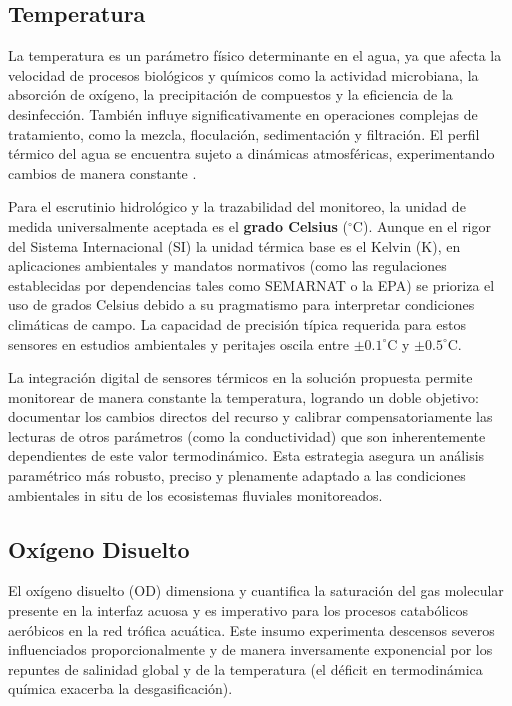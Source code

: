 \subsection{Temperatura}
La temperatura es un parámetro físico determinante en el agua, ya que afecta la velocidad de procesos biológicos y químicos como la actividad microbiana, la absorción de oxígeno, la precipitación de compuestos y la eficiencia de la desinfección. También influye significativamente en operaciones complejas de tratamiento, como la mezcla, floculación, sedimentación y filtración. El perfil térmico del agua se encuentra sujeto a dinámicas atmosféricas, experimentando cambios de manera constante \cite{uno2020}.

Para el escrutinio hidrológico y la trazabilidad del monitoreo, la unidad de medida universalmente aceptada es el \textbf{grado Celsius} ($^\circ$C). Aunque en el rigor del Sistema Internacional (SI) la unidad térmica base es el Kelvin (K), en aplicaciones ambientales y mandatos normativos (como las regulaciones establecidas por dependencias tales como SEMARNAT o la EPA) se prioriza el uso de grados Celsius debido a su pragmatismo para interpretar condiciones climáticas de campo. La capacidad de precisión típica requerida para estos sensores en estudios ambientales y peritajes oscila entre $\pm 0.1^\circ$C y $\pm 0.5^\circ$C.

La integración digital de sensores térmicos en la solución propuesta permite monitorear de manera constante la temperatura, logrando un doble objetivo: documentar los cambios directos del recurso y calibrar compensatoriamente las lecturas de otros parámetros (como la conductividad) que son inherentemente dependientes de este valor termodinámico. Esta estrategia asegura un análisis paramétrico más robusto, preciso y plenamente adaptado a las condiciones ambientales in situ de los ecosistemas fluviales monitoreados.

\subsection{Oxígeno Disuelto}
El oxígeno disuelto (OD) dimensiona y cuantifica la saturación del gas molecular presente en la interfaz acuosa y es imperativo para los procesos catabólicos aeróbicos en la red trófica acuática. Este insumo experimenta descensos severos influenciados proporcionalmente y de manera inversamente exponencial por los repuntes de salinidad global y de la temperatura (el déficit en termodinámica química exacerba la desgasificación).

